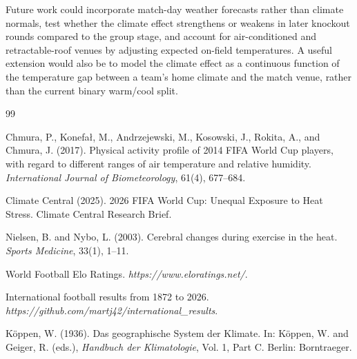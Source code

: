 \documentclass[11pt,a4paper]{article}
\begin{document}
Future work could incorporate match-day weather forecasts rather than climate normals, test whether the climate effect strengthens or weakens in later knockout rounds compared to the group stage, and account for air-conditioned and retractable-roof venues by adjusting expected on-field temperatures. A useful extension would also be to model the climate effect as a continuous function of the temperature gap between a team's home climate and the match venue, rather than the current binary warm/cool split.


\begin{thebibliography}{99}

Chmura, P., Konefa\l{}, M., Andrzejewski, M., Kosowski, J., Rokita, A., and Chmura, J. (2017).
Physical activity profile of 2014 FIFA World Cup players, with regard to different ranges of air temperature and relative humidity.
\textit{International Journal of Biometeorology}, 61(4), 677--684.

Climate Central (2025).
2026 FIFA World Cup: Unequal Exposure to Heat Stress.
Climate Central Research Brief.

Nielsen, B. and Nybo, L. (2003).
Cerebral changes during exercise in the heat.
\textit{Sports Medicine}, 33(1), 1--11.

World Football Elo Ratings.
\textit{https://www.eloratings.net/}.

International football results from 1872 to 2026.
\textit{https://github.com/martj42/international\_results}.

K\"{o}ppen, W. (1936). Das geographische System der Klimate.
In: K\"{o}ppen, W. and Geiger, R. (eds.), \textit{Handbuch der Klimatologie}, Vol. 1, Part C. Berlin: Borntraeger.

\end{thebibliography}
\end{document}
